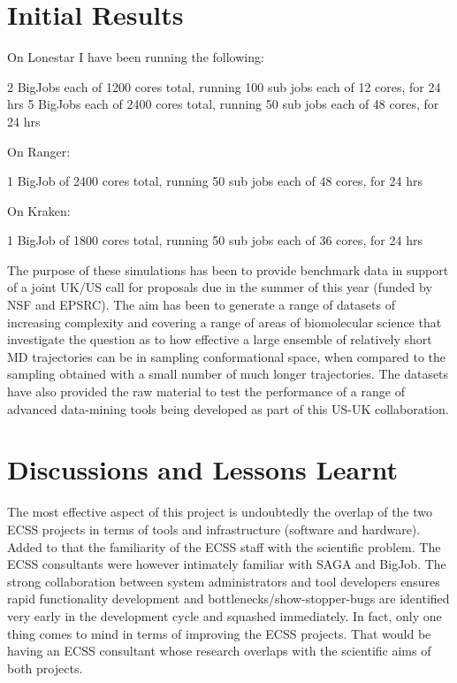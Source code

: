 \documentclass{sig-alternate}
\begin{document}
\section{Initial Results} 

On Lonestar I have been running the following:

2 BigJobs each of 1200 cores total, running 100 sub jobs each of 12 cores, for
24 hrs
5 BigJobs each of 2400 cores total, running 50 sub jobs each of 48 cores, for 24
hrs

On Ranger:

1 BigJob of 2400 cores total, running 50 sub jobs each of 48 cores, for 24 hrs

On Kraken:

1 BigJob of 1800 cores total, running 50 sub jobs each of 36 cores, for 24 hrs

The purpose of these simulations has been to provide benchmark data in support
of a joint UK/US call for proposals due in the summer of this year (funded by
NSF and EPSRC). The aim has been to generate a range of datasets of increasing
complexity and covering a range of areas of biomolecular science that
investigate the question as to how effective a large ensemble of relatively
short MD trajectories can be in sampling conformational space, when compared to
the sampling obtained with a small number of much longer trajectories. The
datasets have also provided the raw material to test the performance of a range
of advanced data-mining tools being developed as part of this US-UK
collaboration.



\section{Discussions and Lessons Learnt}


The most effective aspect of this project is undoubtedly the overlap of the two
ECSS projects in terms of tools and infrastructure (software and hardware).
Added to that the familiarity of the ECSS staff with the scientific problem.
The ECSS consultants were however intimately familiar with SAGA and BigJob. The
strong collaboration between system administrators and tool developers ensures
rapid functionality development and bottlenecks/show-stopper-bugs are identified
very early in the development cycle and squashed immediately. In fact, only one
thing comes to mind in terms of improving the ECSS projects. That would be
having an ECSS consultant whose research overlaps with the scientific aims of
both projects.
\end{document}
